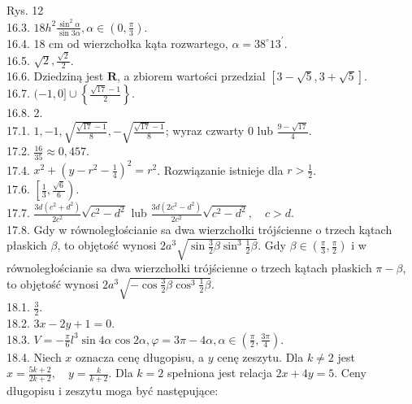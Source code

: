 \documentclass[10pt]{article}
\begin{document}
Rys. 12\\
16.3. $18 h^{2} \frac{\sin ^{2} \alpha}{\sin 3 \alpha}, \alpha \in\left(0, \frac{\pi}{3}\right)$.\\
16.4. 18 cm od wierzchołka kąta rozwartego, $\alpha=38^{\circ} 13^{\prime}$.\\
16.5. $\sqrt{2}, \frac{\sqrt{2}}{2}$.\\
16.6. Dziedziną jest $\mathbf{R}$, a zbiorem wartości przedzial $[3-\sqrt{5}, 3+\sqrt{5}]$.\\
16.7. $(-1,0] \cup\left\{\frac{\sqrt{17}-1}{2}\right\}$.\\
16.8. 2.\\
17.1. $1,-1, \sqrt{\frac{\sqrt{17}-1}{8}},-\sqrt{\frac{\sqrt{17}-1}{8}}$; wyraz czwarty 0 lub $\frac{9-\sqrt{17}}{4}$.\\
17.2. $\frac{16}{35} \approx 0,457$.\\
17.4. $x^{2}+\left(y-r^{2}-\frac{1}{4}\right)^{2}=r^{2}$. Rozwiązanie istnieje dla $r>\frac{1}{2}$.\\
17.6. $\left[\frac{1}{3}, \frac{\sqrt{6}}{6}\right)$.\\
17.7. $\frac{3 d\left(c^{2}+d^{2}\right)}{2 c^{2}} \sqrt{c^{2}-d^{2}}$ lub $\frac{3 d\left(2 c^{2}-d^{2}\right)}{2 c^{2}} \sqrt{c^{2}-d^{2}}, \quad c>d$.\\
17.8. Gdy w równoległościanie sa dwa wierzchołki trójścienne o trzech kątach płaskich $\beta$, to objętość wynosi $2 a^{3} \sqrt{\sin \frac{3}{2} \beta \sin ^{3} \frac{1}{2} \beta}$. Gdy $\beta \in\left(\frac{\pi}{3}, \frac{\pi}{2}\right)$ i w równoległościanie sa dwa wierzchołki trójścienne o trzech kątach płaskich $\pi-\beta$, to objętość wynosi $2 a^{3} \sqrt{-\cos \frac{3}{2} \beta \cos ^{3} \frac{1}{2} \beta}$.\\
18.1. $\frac{3}{2}$.\\
18.2. $3 x-2 y+1=0$.\\
18.3. $V=-\frac{\pi}{6} l^{3} \sin 4 \alpha \cos 2 \alpha, \varphi=3 \pi-4 \alpha, \alpha \in\left(\frac{\pi}{2}, \frac{3 \pi}{4}\right)$.\\
18.4. Niech $x$ oznacza cenę długopisu, a $y$ cenę zeszytu. Dla $k \neq 2$ jest $x=\frac{5 k+2}{2 k+2}, \quad y=\frac{k}{k+2}$. Dla $k=2$ spełniona jest relacja $2 x+4 y=5$. Ceny długopisu i zeszytu moga być następujące:
\end{document}
